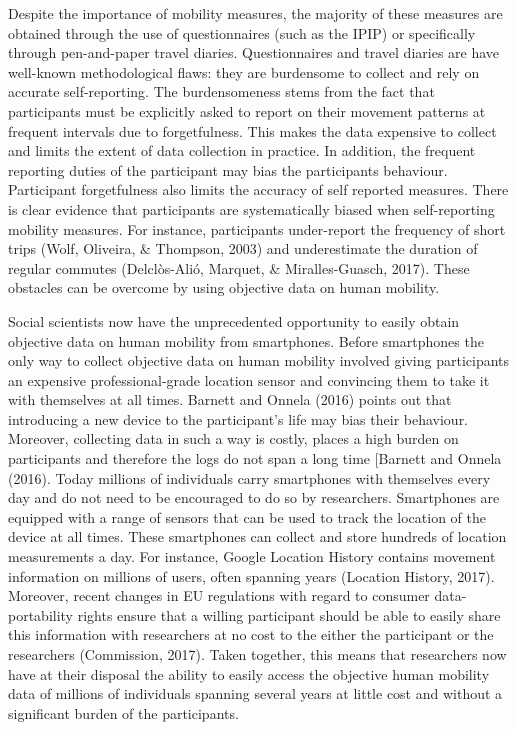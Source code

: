 \documentclass[man]{apa6}
\theoremstyle{definition}
\theoremstyle{definition}
\theoremstyle{definition}
\theoremstyle{remark}
\begin{document}
Despite the importance of mobility measures, the majority of these
measures are obtained through the use of questionnaires (such as the
IPIP) or specifically through pen-and-paper travel diaries.
Questionnaires and travel diaries are have well-known methodological
flaws: they are burdensome to collect and rely on accurate
self-reporting. The burdensomeness stems from the fact that participants
must be explicitly asked to report on their movement patterns at
frequent intervals due to forgetfulness. This makes the data expensive
to collect and limits the extent of data collection in practice. In
addition, the frequent reporting duties of the participant may bias the
participants behaviour. Participant forgetfulness also limits the
accuracy of self reported measures. There is clear evidence that
participants are systematically biased when self-reporting mobility
measures. For instance, participants under-report the frequency of short
trips (Wolf, Oliveira, \& Thompson, 2003) and underestimate the duration
of regular commutes (Delclòs-Alió, Marquet, \& Miralles-Guasch, 2017).
These obstacles can be overcome by using objective data on human
mobility.

Social scientists now have the unprecedented opportunity to easily
obtain objective data on human mobility from smartphones. Before
smartphones the only way to collect objective data on human mobility
involved giving participants an expensive professional-grade location
sensor and convincing them to take it with themselves at all times.
Barnett and Onnela (2016) points out that introducing a new device to
the participant's life may bias their behaviour. Moreover, collecting
data in such a way is costly, places a high burden on participants and
therefore the logs do not span a long time {[}Barnett and Onnela (2016).
Today millions of individuals carry smartphones with themselves every
day and do not need to be encouraged to do so by researchers.
Smartphones are equipped with a range of sensors that can be used to
track the location of the device at all times. These smartphones can
collect and store hundreds of location measurements a day. For instance,
Google Location History contains movement information on millions of
users, often spanning years (Location History, 2017). Moreover, recent
changes in EU regulations with regard to consumer data-portability
rights ensure that a willing participant should be able to easily share
this information with researchers at no cost to the either the
participant or the researchers (Commission, 2017). Taken together, this
means that researchers now have at their disposal the ability to easily
access the objective human mobility data of millions of individuals
spanning several years at little cost and without a significant burden
of the participants.
\end{document}
